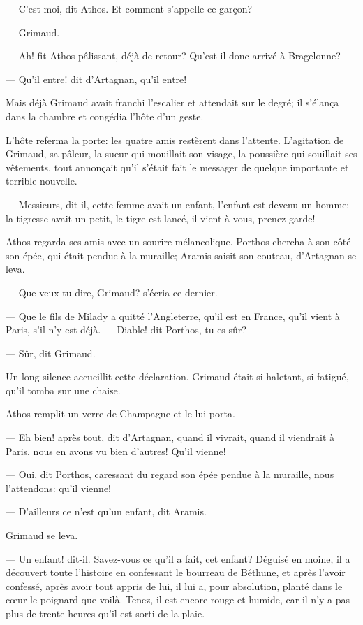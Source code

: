 — C'est moi, dit Athos. Et comment s'appelle ce garçon?

— Grimaud.

— Ah! fit Athos pâlissant, déjà de retour? Qu'est-il donc arrivé à Bragelonne?

— Qu'il entre! dit d'Artagnan, qu'il entre!

Mais déjà Grimaud avait franchi l'escalier et attendait sur le degré; il s'élança dans la chambre et congédia l'hôte d'un geste.

L'hôte referma la porte: les quatre amis restèrent dans l'attente. L'agitation de Grimaud, sa pâleur, la sueur qui mouillait son visage, la poussière qui souillait ses vêtements, tout annonçait qu'il s'était fait le messager de quelque importante et terrible nouvelle.

— Messieurs, dit-il, cette femme avait un enfant, l'enfant est devenu un homme; la tigresse avait un petit, le tigre est lancé, il vient à vous, prenez garde!

Athos regarda ses amis avec un sourire mélancolique. Porthos chercha à son côté son épée, qui était pendue à la muraille; Aramis saisit son couteau, d'Artagnan se leva.

— Que veux-tu dire, Grimaud? s'écria ce dernier.

— Que le fils de Milady a quitté l'Angleterre, qu'il est en France, qu'il vient à Paris, s'il n'y est déjà.
— Diable! dit Porthos, tu es sûr?

— Sûr, dit Grimaud.

Un long silence accueillit cette déclaration. Grimaud était si haletant, si fatigué, qu'il tomba sur une chaise.

Athos remplit un verre de Champagne et le lui porta.

— Eh bien! après tout, dit d'Artagnan, quand il vivrait, quand il viendrait à Paris, nous en avons vu bien d'autres! Qu'il vienne!

— Oui, dit Porthos, caressant du regard son épée pendue à la muraille, nous l'attendons: qu'il vienne!

— D'ailleurs ce n'est qu'un enfant, dit Aramis.

Grimaud se leva.

— Un enfant! dit-il. Savez-vous ce qu'il a fait, cet enfant? Déguisé en moine, il a découvert toute l'histoire en confessant le bourreau de Béthune, et après l'avoir confessé, après avoir tout appris de lui, il lui a, pour absolution, planté dans le cœur le poignard que voilà. Tenez, il est encore rouge et humide, car il n'y a pas plus de trente heures qu'il est sorti de la plaie.

